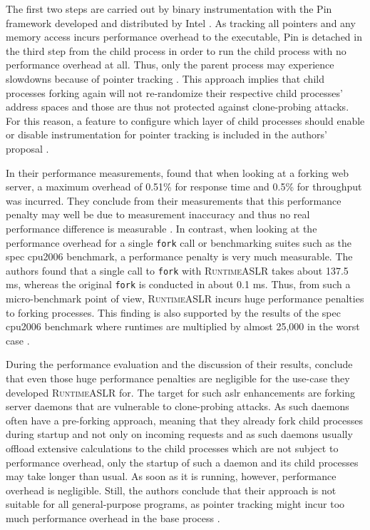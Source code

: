 The first two steps are carried out by binary instrumentation with the Pin framework developed and distributed by Intel \cites{Levi2018}[3\psq]{Lu2016}.
As tracking all pointers and any memory access incurs performance overhead to the executable, Pin is detached in the third step from the child process in order to run the child process with no performance overhead at all.
Thus, only the parent process may experience slowdowns because of pointer tracking \cite[4,11\psqq]{Lu2016}.
This approach implies that child processes forking again will not re-randomize their respective child processes' address spaces and those are thus not protected against clone-probing attacks.
For this reason, a feature to configure which layer of child processes should enable or disable instrumentation for pointer tracking is included in the authors' proposal \cite[9]{Lu2016}.

In their performance measurements, \citeauthor{Lu2016} found that when looking at a forking web server, a maximum overhead of 0.51\% for response time and 0.5\% for throughput was incurred.
They conclude from their measurements that this performance penalty may well be due to measurement inaccuracy and thus no real performance difference is measurable \cite[11\psq]{Lu2016}.
In contrast, when looking at the performance overhead for a single \texttt{fork} call or benchmarking suites such as the \gls{spec} \acs{cpu}2006 benchmark, a performance penalty is very much measurable.
The authors found that a single call to \texttt{fork} with \textsc{RuntimeASLR} takes about 137.5 ms, whereas the original \texttt{fork} is conducted in about 0.1 ms.
Thus, from such a micro-benchmark point of view, \textsc{RuntimeASLR} incurs huge performance penalties to forking processes.
This finding is also supported by the results of the \gls{spec} \acs{cpu}2006 benchmark where runtimes are multiplied by almost 25,000 in the worst case \cite[12]{Lu2016}.

During the performance evaluation and the discussion of their results, \citeauthor{Lu2016} conclude that even those huge performance penalties are negligible for the use-case they developed \textsc{RuntimeASLR} for.
The target for such \gls{aslr} enhancements are forking server daemons that are vulnerable to clone-probing attacks.
As such daemons often have a pre-forking approach, meaning that they already fork child processes during startup and not only on incoming requests and as such daemons usually offload extensive calculations to the child processes which are not subject to performance overhead, only the startup of such a daemon and its child processes may take longer than usual.
As soon as it is running, however, performance overhead is negligible.
Still, the authors conclude that their approach is not suitable for all general-purpose programs, as pointer tracking might incur too much performance overhead in the base process \cite[12\psq]{Lu2016}.


